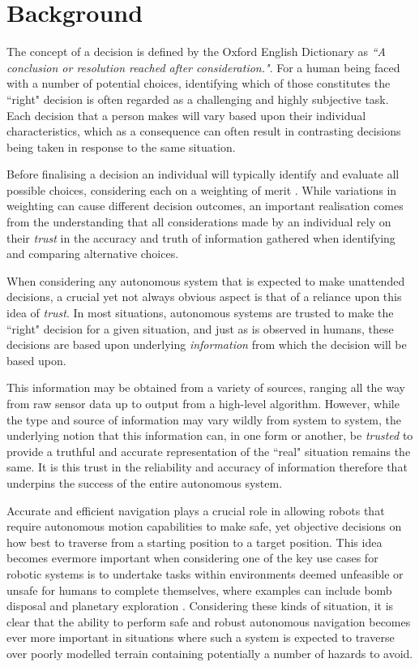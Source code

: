\section{Background}

The concept of a decision is defined by the Oxford English Dictionary \cite{oxford-dictionary} as \textit{``A conclusion or resolution reached after consideration."}. For a human being faced with a number of potential choices, identifying which of those constitutes the ``right" decision is often regarded as a challenging and highly subjective task. Each decision that a person makes will vary based upon their individual characteristics, which as a consequence can often result in contrasting decisions being taken in response to the same situation. 

Before finalising a decision an individual will typically identify and evaluate all possible choices, considering each on a weighting of merit \cite{rational-decision-model}. While variations in weighting can cause different decision outcomes, an important realisation comes from the understanding that all considerations made by an individual rely on their \textit{trust} in the accuracy and truth of information gathered when identifying and comparing alternative choices.

 When considering any autonomous system that is expected to make unattended decisions, a crucial yet not always obvious aspect is that of a reliance upon this idea of \textit{trust}. In most situations, autonomous systems are trusted to make the ``right" decision for a given situation, and just as is observed in humans, these decisions are based upon underlying \textit{information} from which the decision will be based upon.
 
 This information may be obtained from a variety of sources, ranging all the way from raw sensor data up to output from a high-level algorithm. However, while the type and source of information may vary wildly from system to system, the underlying notion that this information can, in one form or another, be \textit{trusted} to provide a truthful and accurate representation of the ``real" situation remains the same. It is this trust in the reliability and accuracy of information therefore that underpins the success of the entire autonomous system.
 
  Accurate and efficient navigation plays a crucial role in allowing robots that require autonomous motion capabilities to make safe, yet objective decisions on how best to traverse from a starting position to a target position. This idea becomes evermore important when considering one of the key use cases for robotic systems is to undertake tasks within environments deemed unfeasible or unsafe for humans to complete themselves, where examples can include bomb disposal \cite{bomb-disposal} and planetary exploration \cite{planet-explore}. Considering these kinds of situation, it is clear that the ability to perform safe and robust autonomous navigation becomes ever more important in situations where such a system is expected to traverse over poorly modelled terrain containing potentially a number of hazards to avoid. 

